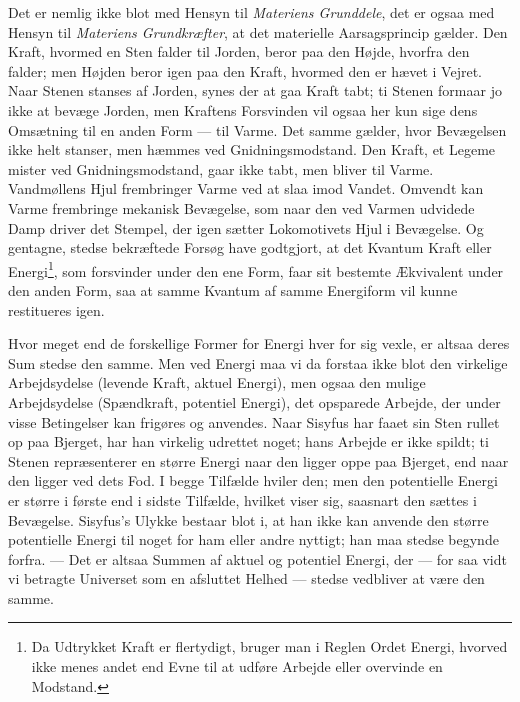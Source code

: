 \documentclass[12pt,a4paper,openany]{book}
\newcommand{\opage}[1]{\marginnote{\footnotesize\textit{[#1]}}}
\begin{document}
Det er nemlig ikke blot med Hensyn til \emph{Materiens Grunddele}, det
er ogsaa med Hensyn til \emph{Materiens Grundkræfter}, at det materielle
Aarsagsprincip gælder. Den Kraft, hvormed en Sten falder til Jorden,
beror paa den Højde, hvorfra den falder; men Højden beror igen paa den
Kraft, hvormed den er hævet i Vejret. Naar Stenen stanses af Jorden,
synes der at gaa Kraft tabt; ti Stenen formaar jo ikke at bevæge Jorden,
men Kraftens Forsvinden vil ogsaa her kun
\opage{39}sige dens Omsætning til en anden Form --- til Varme. Det samme
gælder, hvor Bevægelsen ikke helt stanser, men hæmmes ved
Gnidningsmodstand. Den Kraft, et Legeme mister ved Gnidningsmodstand,
gaar ikke tabt, men bliver til Varme. Vandmøllens Hjul frembringer Varme
ved at slaa imod Vandet. Omvendt kan Varme frembringe mekanisk
Bevægelse, som naar den ved Varmen udvidede Damp driver det Stempel, der
igen sætter Lokomotivets Hjul i Bevægelse. Og gentagne, stedse
bekræftede Forsøg have godtgjort, at det Kvantum Kraft eller
Energi\footnote[1]{Da Udtrykket Kraft er flertydigt, bruger man i Reglen
Ordet Energi, hvorved ikke menes andet end Evne til at udføre Arbejde
eller overvinde en Modstand.}, som forsvinder under den ene Form, faar
sit bestemte Ækvivalent under den anden Form, saa at samme Kvantum af
samme Energiform vil kunne restitueres igen.

Hvor meget end de forskellige Former for Energi hver for sig vexle, er
altsaa deres Sum stedse den samme. Men ved Energi maa vi da forstaa ikke
blot den virkelige Arbejdsydelse (levende Kraft, aktuel Energi), men
ogsaa den mulige Arbejdsydelse (Spændkraft, potentiel Energi), det
opsparede Arbejde, der under visse Betingelser kan frigøres og anvendes.
Naar Sisyfus har faaet sin Sten rullet op paa Bjerget, har han virkelig
udrettet noget; hans Arbejde er ikke spildt; ti Stenen repræsenterer en
større Energi naar den ligger oppe paa Bjerget, end naar den ligger ved
dets Fod. I begge Tilfælde hviler den; men den potentielle Energi er
større i første end i sidste Tilfælde, hvilket viser sig, saasnart den
sættes i Bevægelse. Sisyfus’s Ulykke bestaar blot i, at han ikke kan
anvende den større potentielle Energi til noget for ham eller andre
nyttigt; han maa stedse begynde forfra. --- Det er altsaa Summen af
aktuel og potentiel Energi, der --- for saa vidt vi betragte Universet
som en afsluttet Helhed --- stedse vedbliver at være den samme.
\end{document}
